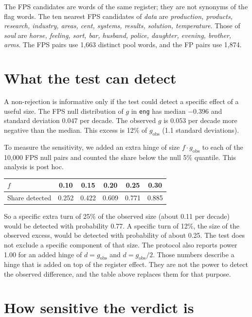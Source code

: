 \documentclass[11pt]{article}
\begin{document}
The FPS candidates are words of the same register; they are not synonyms of the flag words. The ten nearest FPS candidates of \emph{data} are \emph{production, products, research, industry, areas, cent, systems, results, solution, temperature}. Those of \emph{soul} are \emph{horse, feeling, sort, bar, husband, police, daughter, evening, brother, arms}. The FPS pairs use 1,663 distinct pool words, and the FP pairs use 1,874.

\section{What the test can detect}\label{sec:power}
A non-rejection is informative only if the test could detect a specific effect of a useful size. The FPS null distribution of $g$ in \texttt{eng} has median $-0.396$ and standard deviation $0.047$ per decade. The observed $g$ is $0.053$ per decade more negative than the median. This excess is 12\% of $g_{\mathrm{obs}}$ (1.1 standard deviations).

To measure the sensitivity, we added an extra hinge of size $f \cdot g_{\mathrm{obs}}$ to each of the 10,000 FPS null pairs and counted the share below the null 5\% quantile. This analysis is post hoc.

\begin{center}
\begin{tabular}{lccccc}
\toprule
$f$ & 0.10 & 0.15 & 0.20 & 0.25 & 0.30\\
\midrule
Share detected & 0.252 & 0.422 & 0.609 & 0.771 & 0.885\\
\bottomrule
\end{tabular}
\end{center}

So a specific extra turn of 25\% of the observed size (about 0.11 per decade) would be detected with probability 0.77. A specific turn of 12\%, the size of the observed excess, would be detected with probability of about 0.25. The test does not exclude a specific component of that size. The protocol also reports power 1.00 for an added hinge of $d = g_{\mathrm{obs}}$ and $d = g_{\mathrm{obs}}/2$. Those numbers describe a hinge that is added on top of the register effect. They are not the power to detect the observed difference, and the table above replaces them for that purpose.

\section{How sensitive the verdict is}
\end{document}
